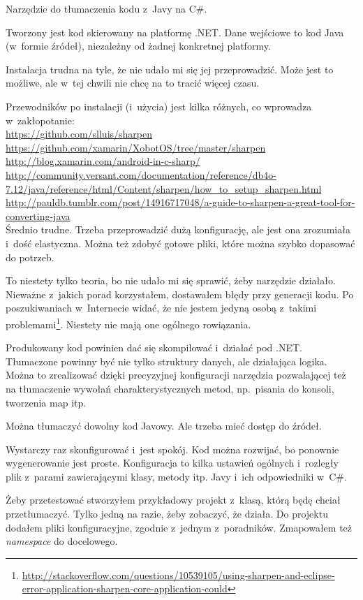 \begin{description}
Narzędzie do tłumaczenia kodu z~Javy na C\#.

Tworzony jest kod skierowany na platformę .NET\@. Dane wejściowe to kod Java (w~formie źródeł), niezależny od żadnej konkretnej platformy.

Instalacja trudna na tyle, że nie udało mi się jej przeprowadzić. Może jest to możliwe, ale w~tej chwili nie chcę na to tracić więcej czasu.

Przewodników po instalacji (i~użycia) jest kilka różnych, co wprowadza w~zakłopotanie: \\
\url{https://github.com/slluis/sharpen}\\
\url{https://github.com/xamarin/XobotOS/tree/master/sharpen}\\
\url{http://blog.xamarin.com/android-in-c-sharp/}\\
\url{http://community.versant.com/documentation/reference/db4o-7.12/java/reference/html/Content/sharpen/how_to_setup_sharpen.html}\\
\url{http://pauldb.tumblr.com/post/14916717048/a-guide-to-sharpen-a-great-tool-for-converting-java}\\

Średnio trudne.
Trzeba przeprowadzić dużą konfigurację, ale jest ona zrozumiała i~dość elastyczna. Można też zdobyć gotowe pliki, które można  szybko dopasować do potrzeb.

To niestety tylko teoria, bo nie udało mi się sprawić, żeby narzędzie działało.
Nieważne z~jakich porad korzystałem, dostawałem błędy przy generacji kodu.
Po poszukiwaniach w~Internecie widać, że nie jestem jedyną osobą z~takimi problemami\footnote{\url{http://stackoverflow.com/questions/10539105/using-sharpen-and-eclipse-error-application-sharpen-core-application-could}}.
Niestety nie mają one ogólnego rowiązania.

Produkowany kod powinien dać się skompilować i~działać pod .NET\@.
Tłumaczone powinny być nie tylko struktury danych, ale działająca logika. Można to zrealizować dzięki precyzyjnej konfiguracji narzędzia pozwalającej też na tłumaczenie wywołań charakterystycznych metod, np.\ pisania do konsoli, tworzenia map itp.

Można tłumaczyć dowolny kod Javowy. Ale trzeba mieć dostęp do źródeł.

Wystarczy raz skonfigurować i~jest spokój. Kod można rozwijać, bo ponownie wygenerowanie jest proste.
Konfiguracja to kilka ustawień ogólnych i~rozległy plik z~parami zawierającymi klasy, metody itp. Javy i~ich odpowiedniki w~C\#.

Żeby przetestować stworzyłem przykładowy projekt z~klasą, którą będę chciał przetłumaczyć. Tylko jedną na razie, żeby zobaczyć, że działa.
Do projektu dodałem pliki konfiguracyjne, zgodnie z~jednym z~poradników. Zmapowałem też \emph{namespace} do docelowego.
\end{description}

